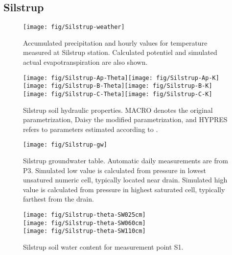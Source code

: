 \subsection*{Silstrup}

\begin{figure}[htbp]
  \begin{center}
    \texttt{[image: fig/Silstrup-weather]}
  \end{center}
  \caption{Accumulated precipitation and hourly values for temperature
    measured at Silstrup station.  Calculated potentiel and simulated
    actual evapotranspiration are also shown.}
  \label{fig:Silstrup-weather}
\end{figure}\FloatBarrier

\begin{figure}[htbp] 
  \texttt{[image: fig/Silstrup-Ap-Theta]}\texttt{[image: fig/Silstrup-Ap-K]}\\
  \texttt{[image: fig/Silstrup-B-Theta]}\texttt{[image: fig/Silstrup-B-K]}\\
  \texttt{[image: fig/Silstrup-C-Theta]}\texttt{[image: fig/Silstrup-C-K]}
  \caption{Silstrup soil hydraulic properties.  MACRO denotes the
    original parametrization, Daisy the modified parametrization, and
    HYPRES refers to parameters estimated according to
    \citet{hypres}.}
  \label{fig:Silstrup-hor}
\end{figure}\FloatBarrier

\begin{figure}[htbp]
  \begin{center}
    \texttt{[image: fig/Silstrup-gw]}
  \end{center}
  \caption{Silstrup groundwater table.  Automatic daily measurements
    are from P3.  Simulated low value is calculated from pressure in
    lowest unsatured numeric cell, typically located near drain.
    Simulated high value is calculated from pressure in highest
    saturated cell, typically farthest from the drain.}
  \label{fig:Silstrup-gw}
\end{figure}\FloatBarrier

\begin{figure}[htbp]
  \begin{center}
    \texttt{[image: fig/Silstrup-theta-SW025cm]}\\
    \texttt{[image: fig/Silstrup-theta-SW060cm]}\\
    \texttt{[image: fig/Silstrup-theta-SW110cm]}
  \end{center}
  \caption{Silstrup soil water content for measurement point S1.}
  \label{fig:Silstrup-theta}
\end{figure}\FloatBarrier

